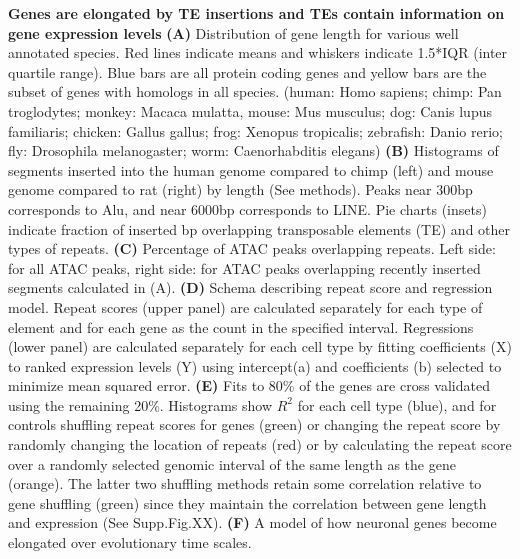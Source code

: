 \textbf{Genes are elongated by TE insertions and TEs contain information on gene expression levels}
\textbf{(A)} Distribution of gene length for various well annotated species. Red lines indicate means and whiskers indicate 1.5*IQR (inter quartile range). Blue bars are all protein coding genes and yellow bars are the subset of genes with homologs in all species. (human: Homo sapiens; chimp: Pan troglodytes; monkey: Macaca mulatta, mouse: Mus musculus; dog: Canis lupus familiaris; chicken: Gallus gallus; frog: Xenopus tropicalis; zebrafish: Danio rerio; fly: Drosophila melanogaster; worm: Caenorhabditis  elegans)
\textbf{(B)} Histograms of segments inserted into the human genome compared to chimp (left) and mouse genome compared to rat (right) by length (See methods). Peaks near 300bp corresponds to Alu, and near 6000bp corresponds to LINE. Pie charts (insets) indicate fraction of inserted bp overlapping transposable elements (TE) and other types of repeats.
\textbf{(C)} Percentage of ATAC peaks overlapping repeats. Left side: for all ATAC peaks, right side: for ATAC peaks overlapping recently inserted segments calculated in (A). 
\textbf{(D)} Schema describing repeat score and regression model. Repeat scores (upper panel) are calculated separately for each type of element and for each gene as the count in the specified interval. Regressions (lower panel) are calculated separately for each cell type by fitting coefficients (X) to ranked expression levels (Y) using intercept(a) and coefficients (b) selected to minimize mean squared error. 
\textbf{(E)} Fits to 80\% of the genes are cross validated using the remaining 20\%. Histograms show $R^2$ for each cell type (blue), and for controls shuffling repeat scores for genes (green) or changing the repeat score by randomly changing the location of repeats (red) or by calculating the repeat score over a randomly selected genomic interval of the same length as the gene (orange). The latter two shuffling methods  retain some correlation relative to gene shuffling (green) since they maintain the correlation between gene length and expression (See Supp.Fig.XX).
\textbf{(F)} A model of how neuronal genes become elongated over evolutionary time scales. 
